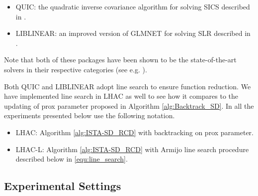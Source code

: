 \documentclass[11pt]{article}
\numberwithin{equation}{section}
\begin{document}
\begin{itemize}
    \item QUIC: the quadratic inverse covariance algorithm for solving SICS described in \cite{Hsieh2011}. 
    \item LIBLINEAR: an improved version of GLMNET for solving SLR described in \cite{GLMNET,nGLMNET}.
\end{itemize}

Note that both of these  packages have been shown to be the state-of-the-art solvers in their respective categories (see e.g. \cite{nGLMNET,Yuan2010,Hsieh2011,Olsen2012}). 

Both QUIC and LIBLINEAR adopt line search to ensure function reduction. We have  implemented line search in LHAC as well to see how it compares to the updating of prox parameter proposed in Algorithm \ref{alg:Backtrack_SD}.  In all the experiments presented below use the following notation. 
\begin{itemize}
    \item LHAC: Algorithm \ref{alg:ISTA-SD_RCD} with backtracking on prox parameter.
    \item LHAC-L: Algorithm \ref{alg:ISTA-SD_RCD} with Armijo line search procedure described below in \eqref{equ:line_search}.
\end{itemize}


\subsection{Experimental Settings} %
\label{sub:data_sets_and_experimental_settings}
\end{document}
